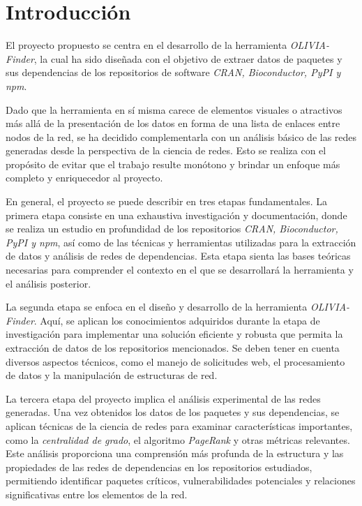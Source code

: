 
\section{Introducción}

El proyecto propuesto se centra en el desarrollo de la herramienta \textit{OLIVIA-Finder}, 
la cual ha sido diseñada con el objetivo de extraer datos de paquetes y sus dependencias de 
los repositorios de software \textit{CRAN, Bioconductor, PyPI y npm}. 

Dado que la herramienta en sí misma carece de elementos visuales o atractivos más allá 
de la presentación de los datos en forma de una lista de enlaces entre nodos de la red, 
se ha decidido complementarla con un análisis básico de las redes generadas desde la perspectiva 
de la ciencia de redes. Esto se realiza con el propósito de evitar que el trabajo resulte monótono 
y brindar un enfoque más completo y enriquecedor al proyecto.

En general, el proyecto se puede describir en tres etapas fundamentales. 
La primera etapa consiste en una exhaustiva investigación y documentación, donde se realiza un estudio 
en profundidad de los repositorios \textit{CRAN, Bioconductor, PyPI y npm}, así como de las técnicas y herramientas 
utilizadas para la extracción de datos y análisis de redes de dependencias. Esta etapa sienta las bases teóricas 
necesarias para comprender el contexto en el que se desarrollará la herramienta y el análisis posterior.

La segunda etapa se enfoca en el diseño y desarrollo de la herramienta \textit{OLIVIA-Finder}. 
Aquí, se aplican los conocimientos adquiridos durante la etapa de investigación para implementar una solución 
eficiente y robusta que permita la extracción de datos de los repositorios mencionados. 
Se deben tener en cuenta diversos aspectos técnicos, como el manejo de solicitudes web, el procesamiento de datos 
y la manipulación de estructuras de red.

La tercera etapa del proyecto implica el análisis experimental de las redes generadas. 
Una vez obtenidos los datos de los paquetes y sus dependencias, se aplican técnicas de la ciencia de redes 
para examinar características importantes, como la \textit{centralidad de grado}, el algoritmo \textit{PageRank} y 
otras métricas relevantes. Este análisis proporciona una comprensión más profunda de la estructura 
y las propiedades de las redes de dependencias en los repositorios estudiados, permitiendo identificar 
paquetes críticos, vulnerabilidades potenciales y relaciones significativas entre los elementos de la red.

